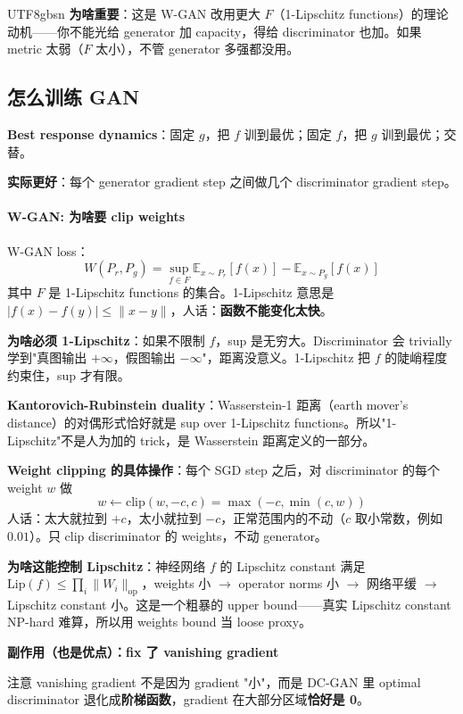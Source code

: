 \documentclass[11pt]{article}
\begin{document}
\begin{CJK}{UTF8}{gbsn}
\textbf{为啥重要}：这是 W-GAN 改用更大 $F$（1-Lipschitz functions）的理论动机——你不能光给 generator 加 capacity，得给 discriminator 也加。如果 metric 太弱（$F$ 太小），不管 generator 多强都没用。

\subsection{怎么训练 GAN}

\textbf{Best response dynamics}：固定 $g$，把 $f$ 训到最优；固定 $f$，把 $g$ 训到最优；交替。

\textbf{实际更好}：每个 generator gradient step 之间做几个 discriminator gradient step。

\paragraph{W-GAN: 为啥要 clip weights}

W-GAN loss：
\[
W(P_r, P_g) = \sup_{f \in F} \mathbb{E}_{x \sim P_r}[f(x)] - \mathbb{E}_{x \sim P_g}[f(x)]
\]
其中 $F$ 是 1-Lipschitz functions 的集合。1-Lipschitz 意思是 $|f(x) - f(y)| \leq \|x - y\|$，人话：\textbf{函数不能变化太快}。

\textbf{为啥必须 1-Lipschitz}：如果不限制 $f$，sup 是无穷大。Discriminator 会 trivially 学到"真图输出 $+\infty$，假图输出 $-\infty$"，距离没意义。1-Lipschitz 把 $f$ 的陡峭程度约束住，sup 才有限。

\textbf{Kantorovich-Rubinstein duality}：Wasserstein-1 距离（earth mover's distance）的对偶形式恰好就是 sup over 1-Lipschitz functions。所以"1-Lipschitz"不是人为加的 trick，是 Wasserstein 距离定义的一部分。

\textbf{Weight clipping 的具体操作}：每个 SGD step 之后，对 discriminator 的每个 weight $w$ 做
\[
w \leftarrow \text{clip}(w, -c, c) = \max(-c, \min(c, w))
\]
人话：太大就拉到 $+c$，太小就拉到 $-c$，正常范围内的不动（$c$ 取小常数，例如 $0.01$）。只 clip discriminator 的 weights，不动 generator。

\textbf{为啥这能控制 Lipschitz}：神经网络 $f$ 的 Lipschitz constant 满足 $\text{Lip}(f) \leq \prod_i \|W_i\|_{\text{op}}$，weights 小 $\to$ operator norms 小 $\to$ 网络平缓 $\to$ Lipschitz constant 小。这是一个粗暴的 upper bound——真实 Lipschitz constant NP-hard 难算，所以用 weights bound 当 loose proxy。

\textbf{副作用（也是优点）：fix 了 vanishing gradient}

注意 vanishing gradient 不是因为 gradient "小"，而是 DC-GAN 里 optimal discriminator 退化成\textbf{阶梯函数}，gradient 在大部分区域\textbf{恰好是 0}。


\end{CJK}
\end{document}

